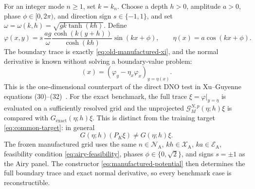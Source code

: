 \documentclass[11pt]{article}
\newcommand{\G}{\mathcal G}
\begin{document}
For an integer mode $n\geq1$, set $k=k_n$.  Choose a depth $h>0$, amplitude
$a>0$, phase $\phi\in[0,2\pi)$, and direction sign $s\in\{-1,1\}$, and set
$\omega=\omega(k,h)=\sqrt{gk\tanh(kh)}$.  Define
\begin{equation}
  \varphi(x,y)
  =s\,\frac{ag}{\omega}
    \frac{\cosh(k(y+h))}{\cosh(kh)}\sin(kx+\phi),\qquad
  \eta(x)=a\cos(kx+\phi).
  \label{eq:manufactured-potential}
\end{equation}
The boundary trace is exactly \eqref{eq:old-manufactured-xi}, and the normal
derivative is known without solving a boundary-value problem:
\begin{equation}
  [G_{\mathrm{exact}}(\eta;h)\xi](x)
  =\left(\varphi_y-\eta_x\varphi_x\right)_{y=\eta(x)}.
  \label{eq:manufactured-exact-dno}
\end{equation}
This is the one-dimensional counterpart of the direct DNO test in
Xu--Guyenne equations (30)--(32)~\cite{xu2009}.  For the exact benchmark, the
full trace $\xi=\varphi|_{y=\eta}$ is evaluated on a sufficiently resolved
grid and the unprojected $\G^{N,p}_M(\eta;h)\xi$ is compared with
$G_{\mathrm{exact}}(\eta;h)\xi$.  This is distinct from the training target
\eqref{eq:common-target}: in general
\begin{equation}
  G(\eta;h)(P_K\xi)\neq G(\eta;h)\xi.
\end{equation}
The frozen manufactured grid uses the same
$n\in\mathcal N_{\mathrm A}$, $kh\in\mathcal X_{\mathrm A}$,
$ka\in\mathcal E_{\mathrm A}$, feasibility condition
\eqref{eq:airy-feasibility}, phases $\phi\in\{0,\sqrt2\}$, and signs
$s=\pm1$ as the Airy panel.  The constructor
\eqref{eq:manufactured-potential} then determines the full boundary trace and
exact normal derivative, so every benchmark case is reconstructible.
\end{document}
